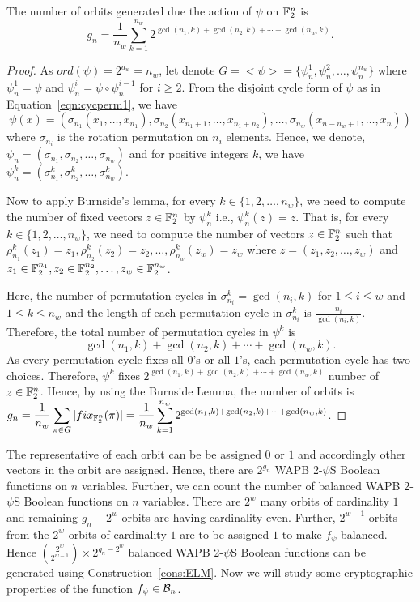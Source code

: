 \documentclass{llncs}
\begin{document}
\begin{theorem}
The number of orbits generated due the action of $\psi$ on $\mathbb{F}_2^n$ is
$$g_n= \frac{1}{n_w} \sum_{k=1}^{n_w}  2^{\gcd(n_1,k)+ \gcd(n_2,k) + \cdots + \gcd(n_w,k)}.$$
\end{theorem}
\begin{proof}
As $ord(\psi) = 2^{a_w} = n_w$, let denote $G = <\psi> = \{\psi_n^1,\psi_n^2, \ldots, \psi_n^{n_w}\}$ where $\psi_n^1 = \psi$ and $\psi_n^i = \psi \circ \psi_n^{i-1}$ for $i \geq 2$. From the disjoint cycle form of $\psi$ as in Equation~\ref{eqn:cycperm1}, we have 
$$\psi(x) = (\sigma_{n_1}(x_1,\ldots,x_{n_1}), \sigma_{n_2}(x_{n_1+1},\ldots,x_{n_1+n_2}), \ldots, \sigma_{n_w}(x_{n-n_w+1},\ldots,x_n))$$
where $\sigma_{n_i}$ is the rotation permutation on $n_i$ elements.
Hence, we denote, $\psi_n = (\sigma_{n_1},\sigma_{n_2},\ldots,\sigma_{n_w})$ and for positive integers $k$, we have $\psi_n^k = (\sigma_{n_1}^k,\sigma_{n_2}^k,\ldots,\sigma_{n_w}^k)$.

Now to apply Burnside's lemma, for every $k \in \{1, 2, \ldots, n_w\}$, we need to compute the number of fixed vectors $z \in \mathbb{F}_2^n$ by $\psi_n^k$ i.e., $\psi_n^k(z) = z$. That is, for every $k \in \{1, 2, \ldots, n_w\}$, we need to compute the number of vectors $z \in \mathbb{F}_2^n$ such that $\rho_{n_1}^k(z_1) = z_1, \rho_{n_2}^k(z_2) = z_2, \ldots, \rho_{n_w}^k(z_w) = z_w$ where $z = (z_1,z_2, \ldots, z_w)$ and $z_1 \in \mathbb{F}_2^{n_1}, z_2 \in \mathbb{F}_2^{n_2}, \ldots, z_w \in \mathbb{F}_2^{n_w}$.

Here, the number of permutation cycles in $\sigma_{n_i}^k= \gcd(n_i,k)$ for $1 \leq i \leq w$ and $1 \leq k \leq n_w$ and the length of each permutation cycle in $\sigma_{n_i}^k$ is $\frac{n_i}{\gcd(n_i,k)}$. 
Therefore, the total number of permutation cycles in $\psi^k$ is $$\gcd(n_1,k)+ \gcd(n_2,k) + \cdots + \gcd(n_w,k).$$
As every permutation cycle fixes all $0$'s or all $1$'s, each permutation cycle has two choices.
Therefore, $\psi^k$ fixes $2^{\gcd(n_1,k)+ \gcd(n_2,k) + \cdots + \gcd(n_w,k)}$ number of $z \in \mathbb{F}_2^n$. Hence, by using the Burnside Lemma, the number of orbits is\\
$\displaystyle{g_n = \frac{1}{n_w} \sum_{\pi \in G} |fix_{\mathbb{F}_2^n}(\pi)| 
    = \frac{1}{n_w} \sum_{k=1}^{n_w}  2^{\gcd(n_1,k)+ \gcd(n_2,k) + \cdots + \gcd(n_w,k)}}$.
\end{proof}
The representative of each orbit can be be assigned $0$ or $1$ and accordingly other vectors in the orbit are assigned. Hence, there are $2^{g_n}$ WAPB 2-$\psi$S Boolean functions on $n$ variables. Further, we can count the number of balanced WAPB 2-$\psi$S Boolean functions on $n$ variables. There are $2^w$ many orbits of cardinality $1$ and remaining $g_n - 2^w$ orbits are having cardinality even. 
Further, $2^{w-1}$ orbits from the $2^w$ orbits of cardinality $1$ are to be assigned $1$ to make $f_\psi$ balanced. Hence $\binom{2^w}{2^{w-1}}\times 2^{g_n - 2^w}$ balanced WAPB 2-$\psi$S Boolean functions can be generated using Construction~\ref{cons:ELM}.
Now we will study some cryptographic properties of the function $f_\psi \in \mathcal{B}_n$. 
\end{document}
